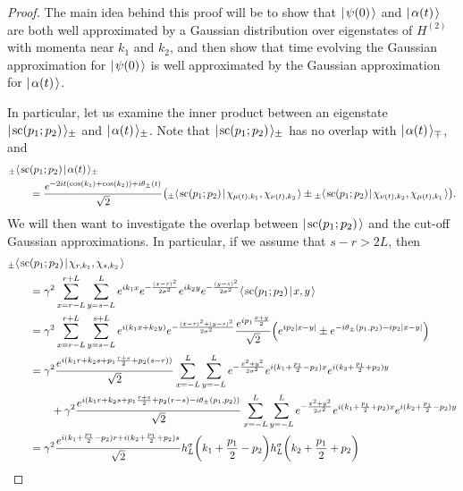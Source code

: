 \documentclass[../thesis-main/thesis-main]{subfiles}
\begin{document}
\begin{proof}
The main idea behind this proof will be to show that $|\mspace{2mu} \psi(0) \mspace{2mu} \rangle$ and $|\mspace{2mu} \alpha (t) \mspace{2mu} \rangle$ are both well approximated by a Gaussian distribution over eigenstates of $H^{(2)}$ with momenta near $k_1$ and $k_2$, and then show that time evolving the Gaussian approximation for $|\mspace{2mu} \psi(0) \mspace{2mu} \rangle$ is well approximated by the Gaussian approximation for $|\mspace{2mu} \alpha(t) \mspace{2mu} \rangle$.  
  
In particular, let us examine the inner product between an eigenstate $|\mspace{2mu} \text{sc} (p_1;p_2) \mspace{2mu} \rangle_{\pm}$ and $|\mspace{2mu} \alpha(t) \mspace{2mu} \rangle_{\pm}$.  Note that $|\mspace{2mu} \text{sc}(p_1;p_2) \mspace{2mu} \rangle_{\pm}$ has no overlap with $|\mspace{2mu} \alpha(t) \mspace{2mu} \rangle_{\mp}$, and 
\begin{align}
  &{}_{\pm}\langle\mspace{2mu} \text{sc}(p_1;p_2) \mspace{2mu} | \mspace{2mu} \alpha(t)\mspace{2mu} \rangle_\pm \nonumber\\
  & \qquad= \frac{e^{-2 i  t (\cos(k_1) + \cos(k_2)) + i\theta_{\pm}(t)}}{\sqrt{2}} \big({}_{\pm}\langle\mspace{2mu} \text{sc} (p_1;p_2) \mspace{2mu} | \mspace{2mu} \chi_{\mu(t),k_1},\chi_{\nu(t),k_2}\mspace{2mu} \rangle  \pm {}_{\pm}\langle\mspace{2mu} \text{sc}(p_1;p_2) \mspace{2mu} | \mspace{2mu} \chi_{\nu(t),k_2},\chi_{\mu(t),k_1}\mspace{2mu} \rangle\big).
\end{align}
We will then want to investigate the overlap between $|\mspace{2mu} \text{sc}(p_1;p_2) \mspace{2mu} \rangle$ and the cut-off Gaussian approximations.  In particular, if we assume that $s - r > 2 L$, then 
\begin{align}
   &_{\pm}\braket{\scat(p_1;p_2)}{\chi_{r,k_1},\chi_{s,k_2}}\nonumber\\
    &\qquad= \gamma^2\sum_{x=r-L}^{r+L} \sum_{y=s-L}^{L} e^{ik_1x}e^{-\frac{(x-r)^2}{2\sigma^2}} e^{i k_2 y}e^{-\frac{(y-s)^2}{2\sigma^2}} \braket{\scat(p_1;p_2)}{x,y}\\
   &\qquad= \gamma^2\sum_{x=r-L}^{r+L} \sum_{y=s-L}^{s+L} e^{i (k_1 x + k_2 y)} e^{-\frac{(x-r)^2 + (y-s)^2}{2\sigma^2}} \frac{e^{i p_1 \frac{x+y}{2}}}{\sqrt{2}} \Big( e^{  i p_2 | x - y|} \pm e^{-i\theta_{\pm}(p_1,p_2) - i p_2 |x-y|}\Big)\\
   &\qquad = \gamma^2\frac{e^{i (k_1 r + k_2 s + p_1 \frac{r+s}{2} + p_2 (s - r))}}{\sqrt{2}} \sum_{x=-L}^{L} \sum_{y=-L}^L e^{ -\frac{ x^2 + y^2}{2\sigma^2}}e^{i ( k_1 + \frac{p_1}{2} -p_2) x} e^{i (k_2 + \frac{p_1}{2} + p_2)y} \nonumber\\
   &\qquad \qquad + \gamma^2 \frac{e^{i (k_1 r + k_2 s + p_1 \frac{r+s}{2} + p_2 (r-s) - i \theta_\pm(p_1,p_2))}}{\sqrt{2}} \sum_{x=-L}^{L} \sum_{y=-L}^L e^{ -\frac{ x^2 + y^2}{2\sigma^2}}e^{i ( k_1 + \frac{p_1}{2} +p_2) x} e^{i (k_2 + \frac{p_1}{2} - p_2)y}\\
   &\qquad = \gamma^2\frac{e^{i (k_1 + \frac{p_1}{2} - p_2) r + i (k_2 + \frac{p_1}{2} + p_2)s}}{\sqrt{2}} h_L^\sigma\bigg( k_1 + \frac{p_1}{2} - p_2\bigg) h_{L}^\sigma \bigg(k_2 + \frac{p_1}{2} + p_2\bigg)\nonumber\\

\end{align}
\end{proof}
\end{document}
